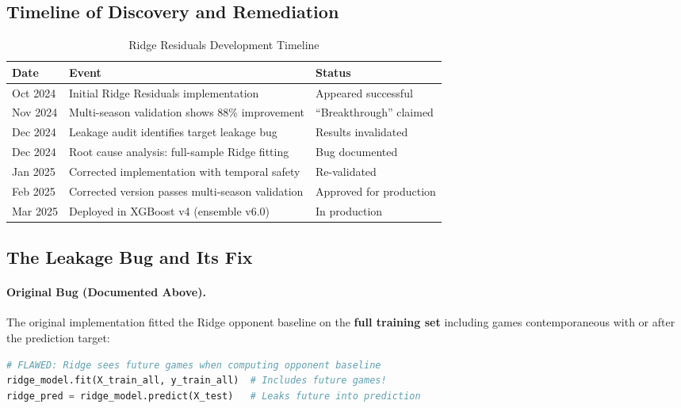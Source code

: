 \subsection{Timeline of Discovery and Remediation}

\begin{table}[htbp]
\centering
\caption{Ridge Residuals Development Timeline}
\label{tab:ridge-residuals-timeline}
\begin{tabular}{@{}lll@{}}
\toprule
\textbf{Date} & \textbf{Event} & \textbf{Status} \\
\midrule
Oct 2024 & Initial Ridge Residuals implementation & Appeared successful \\
Nov 2024 & Multi-season validation shows 88\% improvement & ``Breakthrough'' claimed \\
Dec 2024 & Leakage audit identifies target leakage bug & Results invalidated \\
Dec 2024 & Root cause analysis: full-sample Ridge fitting & Bug documented \\
Jan 2025 & Corrected implementation with temporal safety & Re-validated \\
Feb 2025 & Corrected version passes multi-season validation & Approved for production \\
Mar 2025 & Deployed in XGBoost v4 (ensemble v6.0) & In production \\
\bottomrule
\end{tabular}
\end{table}

\subsection{The Leakage Bug and Its Fix}
\label{sec:appendix_n_leakage_discovery}

\paragraph{Original Bug (Documented Above).}
The original implementation fitted the Ridge opponent baseline on the \textbf{full training set} including games contemporaneous with or after the prediction target:

\begin{lstlisting}[language=Python, style=codestyle, caption={FLAWED: Full-sample Ridge fitting (original bug)}]
# FLAWED: Ridge sees future games when computing opponent baseline
ridge_model.fit(X_train_all, y_train_all)  # Includes future games!
ridge_pred = ridge_model.predict(X_test)   # Leaks future into prediction
\end{lstlisting}

